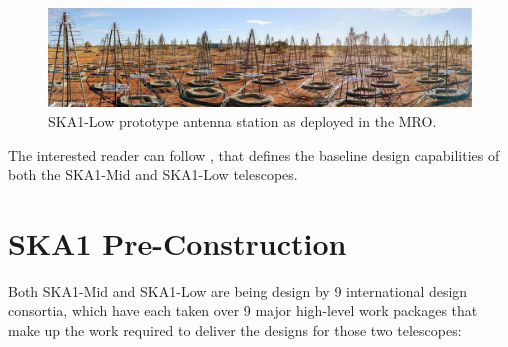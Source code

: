 \documentclass[a4paper,
               biblatex,       %
               keeplastbox,    %
               ]{jacow-2_1}    %
\begin{document}
\begin{figure}[!tb]
  \centering
    \includegraphics[width=\columnwidth]{FRAPL01f4}
  \caption{SKA1-Low prototype antenna station as deployed in the MRO.}
  \label{fig:SKA1-Low_prototype_station}
\end{figure}


The interested reader can follow \cite{SKA-TEL-SKO-0000002_03}, that defines the baseline design capabilities of both the SKA1-Mid and SKA1-Low telescopes.



\section{SKA1 Pre-Construction} %
\label{sec:ska1_preconstruction}

Both SKA1-Mid and SKA1-Low are being design by 9 international design consortia, which have each taken over 9 major high-level work packages that make up the work required to deliver the designs for those two telescopes:
\end{document}
